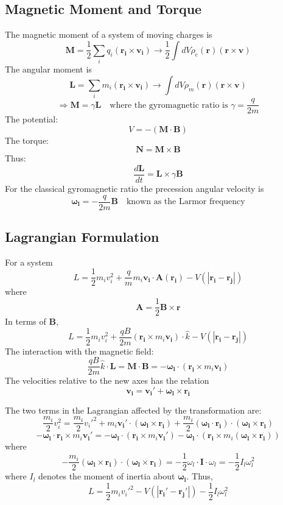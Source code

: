 \documentclass[12pt]{article}
\renewcommand{\vec}[1]{\mathbf{#1}}
\begin{document}
	\subsection*{Magnetic Moment and Torque}
	The magnetic moment of a system of moving charges is
	\[ \vec{M} = \frac{1}{2} \sum_i q_i (\vec{r_i} \times \vec{v_i}) \to \frac{1}{2} \int dV \rho_e(\vec{r}) (\vec{r} \times \vec{v}) \]
	The angular moment is
	\[ \vec{L} = \sum_i m_i (\vec{r_i} \times \vec{v_i}) \to \int dV \rho_m(\vec{r}) (\vec{r} \times \vec{v}) \]
	\[ \Rightarrow \vec{M} = \gamma \vec{L} \quad \text{where the gyromagnetic ratio is } \gamma = \frac{q}{2m} \]
	The potential:
	\[ V = - (\vec{M} \cdot \vec{B}) \]
	The torque:
	\[ \vec{N} = \vec{M} \times \vec{B} \]
	Thus:
	\[ \frac{d\vec{L}}{dt} = \vec{L} \times \gamma\vec{B} \]
	For the classical gyromagnetic ratio the precession angular velocity is
	\[ \vec{\omega_l} = - \frac{q}{2m} \vec{B} \quad \text{known as the Larmor frequency} \]
	
	\subsection*{Lagrangian Formulation}
	For a system
	\[ L = \frac{1}{2} m_i v_i^2 + \frac{q}{m} m_i \vec{v_i} \cdot \vec{A}(\vec{r_i}) - V(|\vec{r_i} - \vec{r_j}|) \]
	where
	\[ \vec{A} = \frac{1}{2} \vec{B} \times \vec{r} \]
	In terms of $\vec{B}$,
	\[ L = \frac{1}{2} m_i v_i^2 + \frac{q B}{2m} (\vec{r_i} \times m_i \vec{v_i}) \cdot \hat{k} - V(|\vec{r_i} - \vec{r_j}|) \]
	The interaction with the magnetic field:
	\[ \frac{q B}{2m} \hat{k} \cdot \vec{L} = \vec{M} \cdot \vec{B} = - \vec{\omega_l} \cdot (\vec{r_i} \times m_i \vec{v_i}) \]
	The velocities relative to the new axes has the relation
	\[ \vec{v_i} = \vec{v_i}' + \vec{\omega_l} \times \vec{r_i} \]
	
	The two terms in the Lagrangian affected by the transformation are:
	\[ \frac{m_i}{2} v_i^2 = \frac{m_i}{2} v_i'^2 + m_i \vec{v_i}' \cdot (\vec{\omega_l} \times \vec{r_i}) + \frac{m_i}{2} (\vec{\omega_l} \cdot \vec{r_i}) \cdot (\vec{\omega_l} \times \vec{r_i}) \]
	\[ - \vec{\omega_l} \cdot \vec{r_i} \times m_i \vec{v_i}' = - \vec{\omega_l} \cdot (\vec{r_i} \times m_i \vec{v_i}') - \vec{\omega_l} \cdot (\vec{r_i} \times m_i (\vec{\omega_l} \times \vec{r_i})) \]
	where
	\[ - \frac{m_i}{2} (\vec{\omega_l} \times \vec{r_i}) \cdot (\vec{\omega_l} \times \vec{r_i}) = - \frac{1}{2} \omega_l \cdot \boldsymbol{I} \cdot \omega_l = - \frac{1}{2} I_{l} \omega_l^2 \]
	where $I_l$ denotes the moment of inertia about $\vec{\omega_l}$. Thus,
	\[ L = \frac{1}{2} m_i v_i'^2 - V(|\vec{r_i}' - \vec{r_j}'|) - \frac{1}{2} I_{l} \omega_l^2 \]
\end{document}
